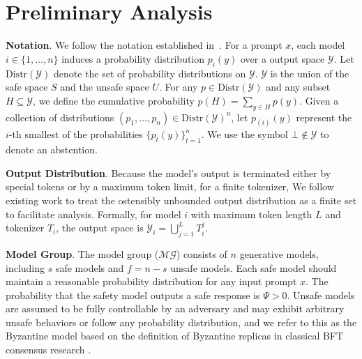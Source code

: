 \section{Preliminary Analysis}



\noindent
\textbf{Notation}.
We follow the notation established in~\citep{kalai2025consensus}. For a prompt $x$, each model $i \in \{1, \dots, n\}$ induces a probability distribution $p_i(y)$ over a output space $\mathcal{Y}$. Let $\mathrm{Distr}(\mathcal{Y})$ denote the set of probability distributions on $\mathcal{Y}$. $\mathcal{Y}$ is the union of the safe space $S$ and the unsafe space $U$. For any $p \in \mathrm{Distr}(\mathcal{Y})$ and any subset $H \subseteq \mathcal{Y}$, we define the cumulative probability $p(H) = \sum_{y \in H} p(y)$. Given a collection of distributions $(p_1, \ldots, p_n) \in \mathrm{Distr}(\mathcal{Y})^n$, let $p_{(i)}(y)$ represent the $i$-th smallest of the probabilities $\{ p_t(y) \}_{t=1}^n$. We use the symbol $\bot \notin \mathcal{Y}$ to denote an abstention. 

\noindent
\textbf{Output Distribution}. Because the model's output is terminated either by special tokens or by a maximum token limit, for a finite tokenizer, We follow existing work \citep{chijiwa2025lossless} to treat the ostensibly unbounded output distribution as a finite set to facilitate analysis. Formally, for model $i$ with maximum token length $L$ and tokenizer $T_i$, the output space is $\mathcal{Y}_i = \bigcup_{j=1}^{L} T_i^j$.


\noindent
\textbf{Model Group}.
The model group ($\mathcal{MG}$) consists of $n$ generative models, including $s$ safe models and 
$f=n-s$ unsafe models. Each safe model should maintain a reasonable probability distribution for any input prompt $x$. The probability that the safety model outputs a safe response is $\Psi > 0$. Unsafe models are assumed to be fully controllable by an adversary and may exhibit arbitrary unsafe behaviors or follow any probability distribution, and we refer to this as the Byzantine model based on the definition of Byzantine replicas in classical BFT consensus research \citep{zhang2023waterbear, dashing2024duan, Das2024AC}.




